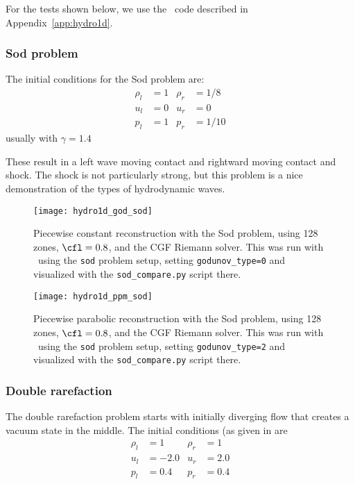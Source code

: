 For the tests shown below, we use the \hydrooned\ code described in
Appendix~\ref{app:hydro1d}.

\subsubsection{Sod problem}

The initial conditions for the Sod problem \cite{sod:1978} are:
\begin{align}
\rho_l &= 1      &  \rho_r &= 1/8 \nonumber \\
u_l   &= 0       &  u_r    &= 0   \\
p_l    &= 1      &  p_r    &= 1/10 \nonumber
\end{align}
usually with $\gamma = 1.4$

These result in a left wave moving contact and rightward moving
contact and shock.  The shock is not particularly strong, but this
problem is a nice demonstration of the types of hydrodynamic waves.

\begin{figure}[t]
\centering
\texttt{[image: hydro1d\_god\_sod]}
\caption[Piecewise constant reconstruction Sod problem]{\label{fig:Euler:sod:god} Piecewise constant reconstruction
  with the Sod problem, using 128 zones, $\cfl = 0.8$, and the CGF
  Riemann solver.  This was run with \hydrooned\ using the {\tt sod}
  problem setup, setting {\tt godunov\_type=0} and visualized with the
  {\tt sod\_compare.py} script there.}
\end{figure}

\begin{figure}[t]
\centering
\texttt{[image: hydro1d\_ppm\_sod]}
\caption[Piecewise parabolic reconstruction Sod problem]{\label{fig:Euler:sod:ppm} Piecewise parabolic reconstruction
  with the Sod problem, using 128 zones, $\cfl = 0.8$, and the CGF
  Riemann solver.  This was run with \hydrooned\ using the {\tt sod}
  problem setup, setting {\tt godunov\_type=2} and visualized with the
  {\tt sod\_compare.py} script there.}
\end{figure}


\subsubsection{Double rarefaction}

The double rarefaction problem starts with initially diverging flow
that creates a vacuum state in the middle.  The initial conditions (as
given in \cite{toro:1997} are
\begin{align}
\rho_l &= 1      &  \rho_r &= 1 \nonumber \\
u_l    &= -2.0   &  u_r    &= 2.0   \\
p_l    &= 0.4    &  p_r    &= 0.4 \nonumber
\end{align}



